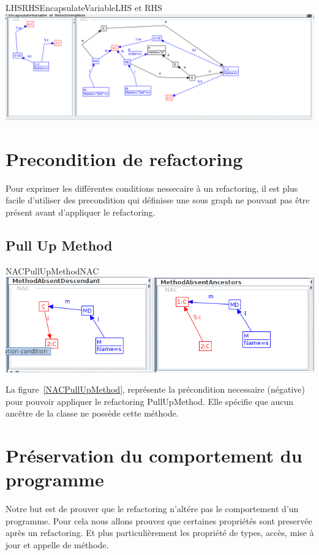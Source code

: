 \documentclass[a4paper, 10pt]{article}
\begin{document}
\begin{myfig}{LHSRHSEncapsulateVariable}{LHS et RHS}
\includegraphics[width=\textwidth]{LHSRHSEncapsulateVariable.png}
\end{myfig}

\section{Precondition de refactoring}
Pour exprimer les différentes conditions nessecaire à un refactoring, il est plus facile d'utiliser des precondition qui définisse une sous graph ne pouvant pas être présent avant d'appliquer le refactoring.

\subsection{Pull Up Method}

\begin{myfig}{NACPullUpMethod}{NAC}
\includegraphics[width=\textwidth]{NACPullUpMethod.png}
\end{myfig}

La figure~\ref{NACPullUpMethod}, représente la précondition necessaire (négative) pour pouvoir appliquer le refactoring PullUpMethod.
Elle spécifie que aucun ancêtre de la classe ne possède cette méthode.

\section{Préservation du comportement du programme}

Notre but est de prouver que le refactoring n'altére pas le comportement d'un programme. Pour cela nous allons prouvez que certaines propriétés sont preservée après un refactoring. Et plus particulièrement les propriété de types, accès, mise à jour et appelle de méthode.
\end{document}
